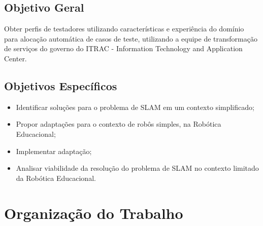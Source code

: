 \subsection{Objetivo Geral}

Obter perfis de testadores utilizando características e experiência do domínio para alocação automática de casos de teste,
utilizando a equipe de transformação de serviços do governo do ITRAC - Information Technology and Application Center.

\subsection{Objetivos Específicos}

\begin{itemize}
		\item Identificar soluções para o problema de SLAM em um contexto simplificado;
		\item Propor adaptações para o contexto de robôs simples, na Robótica Educacional;
		\item Implementar adaptação;
		\item Analisar viabilidade da resolução do problema de SLAM no contexto limitado da Robótica Educacional.
	\end{itemize}

\section{Organização do Trabalho}
